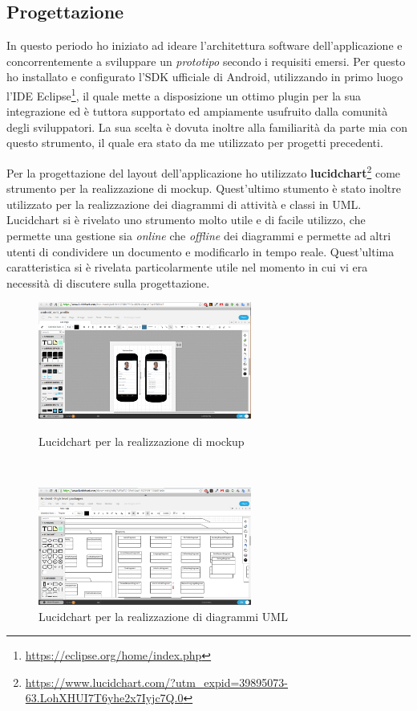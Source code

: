 \subsection*{Progettazione}

In questo periodo ho iniziato ad ideare l'architettura software dell'applicazione e concorrentemente a sviluppare un \textit{prototipo} secondo i requisiti emersi. Per questo ho installato e configurato l'SDK ufficiale di Android, utilizzando in primo luogo l'\gls{IDE} Eclipse\footnote{\url{https://eclipse.org/home/index.php}}, il quale mette a disposizione un ottimo plugin per la sua integrazione ed è tuttora supportato ed ampiamente usufruito dalla comunità degli sviluppatori. La sua scelta è dovuta inoltre alla familiarità da parte mia con questo strumento, il quale era stato da me utilizzato per progetti precedenti.  

Per la progettazione del layout dell'applicazione ho utilizzato \textbf{lucidchart}\footnote{\url{https://www.lucidchart.com/?utm_expid=39895073-63.LohXHUI7T6yhe2x7Iyjc7Q.0}} come strumento per la realizzazione di \gls{mockup}. Quest'ultimo stumento è stato inoltre utilizzato per la realizzazione dei diagrammi di attività e classi in \gls{UML}. Lucidchart si è rivelato uno strumento molto utile e di facile utilizzo, che permette una gestione sia \textit{online} che \textit{offline} dei diagrammi e permette ad altri utenti di condividere un documento e modificarlo in tempo reale. Quest'ultima caratteristica si è rivelata particolarmente utile nel momento in cui vi era necessità di discutere sulla progettazione. 

\begin{figure}
\begin{minipage}[b]{7cm}
\centering
\includegraphics[width=7cm]{../immagini/lucidchart-mockup}
\caption{Lucidchart per la realizzazione di mockup}
\end{minipage}
\ \hspace{2mm} \hspace{3mm} \
\begin{minipage}[b]{7cm}
\centering
\includegraphics[width=7cm]{../immagini/lucidchart-uml}
\caption{Lucidchart per la realizzazione di diagrammi UML}
\end{minipage}
\end{figure}


